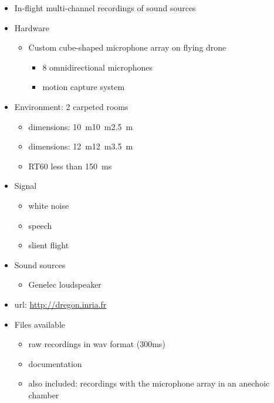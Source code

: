 \documentclass[14pt, legalpaper]{extarticle}
\begin{document}
\begin{itemize}

\item In-flight multi-channel recordings of sound sources \cite{strauss2018dregon}

\item Hardware
	\begin{itemize}
	\item Custom cube-shaped microphone array on flying drone
		\begin{itemize}
		\item 8 omnidirectional microphones
		\item motion capture system 
		\end{itemize}
	\end{itemize}

\item Environment: 2 carpeted rooms
	\begin{itemize}
	\item dimensions: \SI{10}{\metre}\texttimes\SI{10}{\metre}\texttimes\SI{2.5}{\metre}
	\item dimensions: \SI{12}{\metre}\texttimes\SI{12}{\metre}\texttimes\SI{3.5}{\metre}
	\item RT60 less than \SI{150}{\milli\second}
	\end{itemize}

\item Signal
	\begin{itemize}
	\item white noise
	\item speech
	\item slient flight
	\end{itemize}

\item Sound sources
	\begin{itemize}
	\item Genelec loudspeaker
	\end{itemize}

\item url: \href{http://dregon.inria.fr}{http://dregon.inria.fr} 

\item Files available
	\begin{itemize}
	\item raw recordings in wav format (300ms)
	\item documentation
	\item also included: recordings with the microphone array in an anechoic chamber
	\end{itemize}

\end{itemize}
\end{document}
